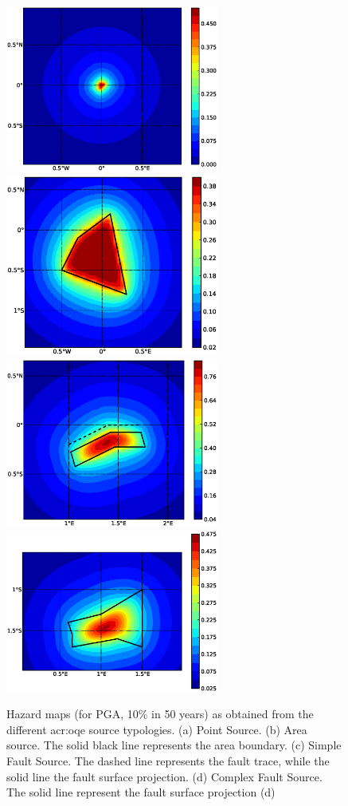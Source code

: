 \begin{figure} 
\centering 
\subcaptionbox{}
{\includegraphics[width=7cm]{./figures/hazard/point.eps}} 
\subcaptionbox{}
{\includegraphics[width=7cm]{./figures/hazard/area.eps}} 
\subcaptionbox{}
{\includegraphics[width=7cm]{./figures/hazard/simple_fault.eps}} 
\subcaptionbox{}
{\includegraphics[width=7cm]{./figures/hazard/complex_fault.eps}} 
\caption{Hazard maps (for PGA, 10\% in 50 years) as obtained from the 
    different \gls{acr:oqe} source typologies. (a) Point Source. (b) Area 
    source.  The solid black line represents the area boundary. (c) Simple 
    Fault Source. 
    The dashed line represents the fault trace, while the solid line the fault
    surface projection. (d) Complex Fault Source. The solid line represent the 
    fault surface projection (d)}
\label{fig:hazard_maps1}
\end{figure}

